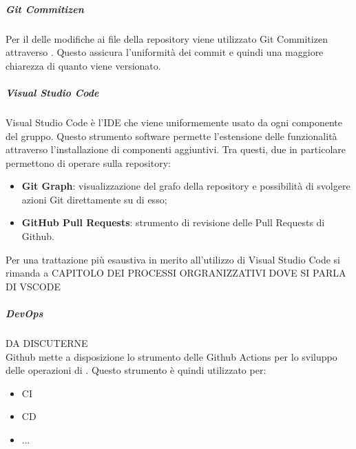 \documentclass[../norme-di-progetto.tex]{subfiles}
\begin{document}
\subparagraph*{Git Commitizen}
Per il  delle modifiche ai file della repository viene utilizzato Git Commitizen attraverso . Questo assicura l'uniformità dei commit e quindi una maggiore chiarezza di quanto viene versionato.

\subparagraph*{Visual Studio Code}
Visual Studio Code è l'IDE che viene uniformemente usato da ogni componente del gruppo. Questo strumento software permette l'estensione delle funzionalità attraverso l'installazione di componenti aggiuntivi. Tra questi, due in particolare permettono di operare sulla repository:
\begin{itemize}
  \item \textbf{Git Graph}: visualizzazione del grafo della repository e possibilità di svolgere azioni Git direttamente su di esso;
  \item \textbf{GitHub Pull Requests}: strumento di revisione delle Pull Requests di Github.
\end{itemize}
Per una trattazione più esaustiva in merito all'utilizzo di Visual Studio Code si rimanda a CAPITOLO DEI PROCESSI ORGRANIZZATIVI DOVE SI PARLA DI VSCODE

\subparagraph{DevOps} DA DISCUTERNE \\
Github mette a disposizione lo strumento delle Github Actions per lo sviluppo delle operazioni di . Questo strumento è quindi utilizzato per:
\begin{itemize}
  \item CI
  \item CD
  \item ...
\end{itemize}
\end{document}
